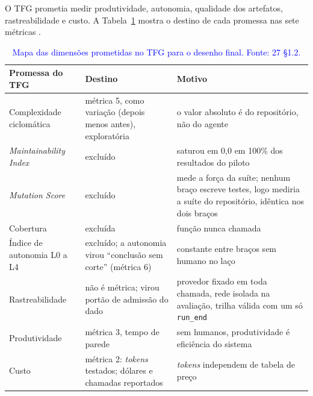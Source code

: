\begin{novobloco}
O TFG prometia medir produtividade, autonomia, qualidade dos artefatos, rastreabilidade e custo. A Tabela~\ref{tab-tfg} mostra o destino de cada promessa nas sete métricas .

\begin{table}[t]
\centering
\color{blue}
\caption{\textcolor{blue}{Mapa das dimensões prometidas no TFG para o desenho final. Fonte: 27 \S1.2.}}
\label{tab-tfg}
\small
\begin{tabular}{p{3.6cm}p{5.2cm}p{6.6cm}}
\toprule
Promessa do TFG & Destino & Motivo \\
\midrule
Complexidade ciclomática & métrica 5, como variação (depois menos antes), exploratória & o valor absoluto é do repositório, não do agente \\
\textit{Maintainability Index} & excluído & saturou em 0,0 em 100\% dos resultados do piloto \\
\textit{Mutation Score} & excluído & mede a força da suíte; nenhum braço escreve testes, logo mediria a suíte do repositório, idêntica nos dois braços \\
Cobertura & excluída & função nunca chamada \\
Índice de autonomia L0 a L4 & excluído; a autonomia virou ``conclusão sem corte'' (métrica 6) & constante entre braços sem humano no laço \\
Rastreabilidade & não é métrica; virou portão de admissão do dado & provedor fixado em toda chamada, rede isolada na avaliação, trilha válida com um só \texttt{run\_end} \\
Produtividade & métrica 3, tempo de parede & sem humanos, produtividade é eficiência do sistema \\
Custo & métrica 2: \textit{tokens} testados; dólares e chamadas reportados & \textit{tokens} independem de tabela de preço \\
\bottomrule
\end{tabular}
\end{table}
\end{novobloco}

